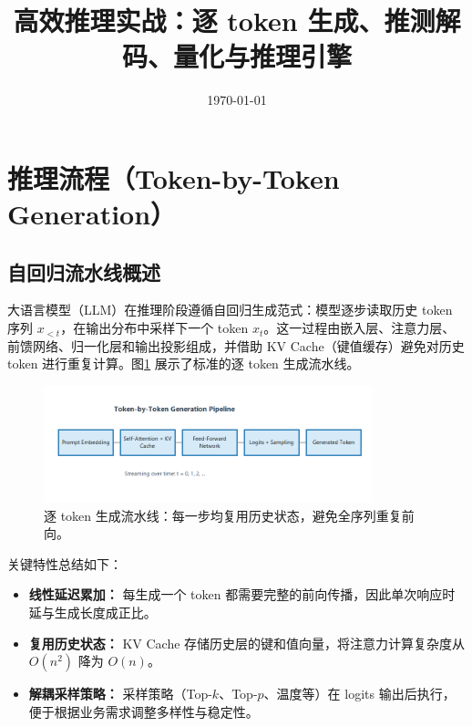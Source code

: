 \documentclass[UTF8,zihao=-4]{ctexart}
\title{高效推理实战：逐 token 生成、推测解码、量化与推理引擎}
\author{}
\date{\today}
\begin{document}
\maketitle

\section{推理流程（Token-by-Token Generation）}
\subsection{自回归流水线概述}
大语言模型（LLM）在推理阶段遵循自回归生成范式：模型逐步读取历史 token 序列 $x_{<t}$，在输出分布中采样下一个 token $x_t$。这一过程由嵌入层、注意力层、前馈网络、归一化层和输出投影组成，并借助 KV Cache（键值缓存）避免对历史 token 进行重复计算。图\ref{fig:token_pipeline} 展示了标准的逐 token 生成流水线。
\begin{figure}[H]
  \centering
  \includegraphics[width=0.85\textwidth]{token_generation_pipeline.png}
  \caption{逐 token 生成流水线：每一步均复用历史状态，避免全序列重复前向。}
  \label{fig:token_pipeline}
\end{figure}
关键特性总结如下：
\begin{itemize}
  \item \textbf{线性延迟累加：} 每生成一个 token 都需要完整的前向传播，因此单次响应时延与生成长度成正比。
  \item \textbf{复用历史状态：} KV Cache 存储历史层的键和值向量，将注意力计算复杂度从 $O(n^2)$ 降为 $O(n)$。
  \item \textbf{解耦采样策略：} 采样策略（Top-$k$、Top-$p$、温度等）在 logits 输出后执行，便于根据业务需求调整多样性与稳定性。
\end{itemize}
\end{document}
